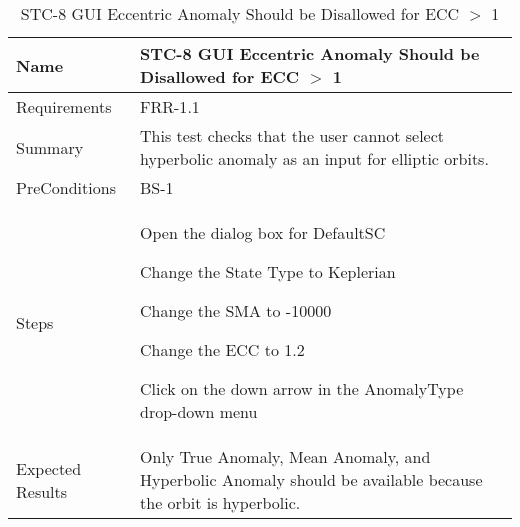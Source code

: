 

\begin{table}[htbp!]
\centering
      \begin{tabular}{|p{1.05 in} |p{4.75 in} |}
      \hline
         \rowcolor[rgb]{0.8,0.8,0.8} Name & STC-8 GUI Eccentric Anomaly Should be Disallowed for ECC $>$ 1\\   \hline
         Requirements & FRR-1.1 \\  \hline
         Summary &
         This test checks that the user cannot select hyperbolic anomaly as an input for
         elliptic orbits.
         \\     \hline
         PreConditions & BS-1 \\  \hline
         Steps &
         \begin{compactenum}
             \item Open the dialog box for DefaultSC
             \item Change the State Type to Keplerian
             \item Change the SMA to -10000
             \item Change the ECC to 1.2
             \item Click on the down arrow in the AnomalyType drop-down menu
         \end{compactenum}
         \\ \hline
         Expected Results & Only True Anomaly, Mean Anomaly, and Hyperbolic Anomaly should be
         available because the orbit is hyperbolic.
         \\  \hline
      \end{tabular}
      \label{Table: STC-8}
      \caption{STC-8 GUI Eccentric Anomaly Should be Disallowed for ECC $>$ 1}
\end{table} 